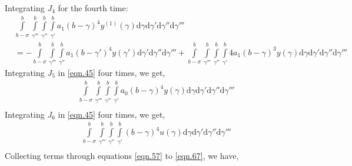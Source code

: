 \documentclass{article}
\begin{document}
Integrating $J_4$ for the fourth time:
\begin{equation}
\begin{split}
	&\int\limits_{b-\sigma}^{b}\int\limits_{\gamma'''}^{b}\int\limits_{\gamma''}^{b}\int\limits_{\gamma'}^{b}a_1(b-\gamma)^{4}y^{(1)}(\gamma)\mathrm{d}\gamma\mathrm{d}\gamma'\mathrm{d}\gamma''\mathrm{d}\gamma'''\\
	&=-\int\limits_{b-\sigma}^{b}\int\limits_{\gamma'''}^{b}\int\limits_{\gamma''}^{b}a_1(b-\gamma')^{4}y(\gamma')\mathrm{d}\gamma'\mathrm{d}\gamma''\mathrm{d}\gamma''' + \int\limits_{b-\sigma}^{b}\int\limits_{\gamma'''}^{b}\int\limits_{\gamma''}^{b}\int\limits_{\gamma'}^{b}4a_1(b-\gamma)^{3}y(\gamma)\mathrm{d}\gamma\mathrm{d}\gamma'\mathrm{d}\gamma''\mathrm{d}\gamma'''
\end{split}
\end{equation}
Integrating $J_5$ in \eqref{eqn.45} four times, we get,
\begin{equation}
\begin{split}
	&\int\limits_{b-\sigma}^{b}\int\limits_{\gamma'''}^{b}\int\limits_{\gamma''}^{b}\int\limits_{\gamma'}^{b}a_0(b-\gamma)^{4}y(\gamma)\mathrm{d}\gamma\mathrm{d}\gamma'\mathrm{d}\gamma''\mathrm{d}\gamma'''\\
\end{split}
\end{equation}
Integrating $J_6$ in \eqref{eqn.45} four times, we get,
\begin{equation}\label{eqn.67}
\begin{split}
	&\int\limits_{b-\sigma}^{b}\int\limits_{\gamma'''}^{b}\int\limits_{\gamma''}^{b}\int\limits_{\gamma'}^{b}(b-\gamma)^{4}u(\gamma)\mathrm{d}\gamma\mathrm{d}\gamma'\mathrm{d}\gamma''\mathrm{d}\gamma'''\\
\end{split}
\end{equation}
Collecting terms through equations \eqref{eqn.57} to \eqref{eqn.67}, we have,
\end{document}
